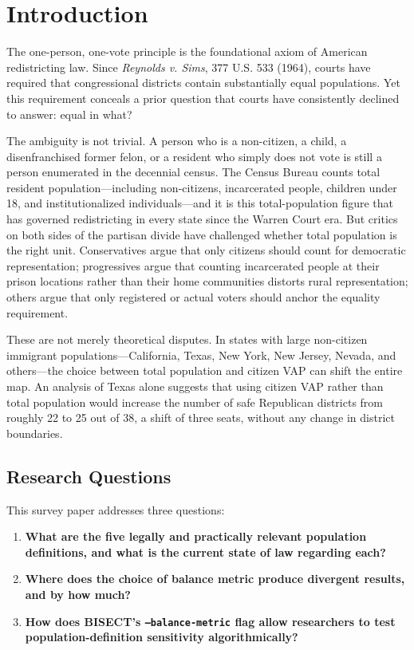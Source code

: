 \section{Introduction}

The one-person, one-vote principle is the foundational axiom of American redistricting law. Since \emph{Reynolds v. Sims}, 377 U.S. 533 (1964), courts have required that congressional districts contain substantially equal populations. Yet this requirement conceals a prior question that courts have consistently declined to answer: equal in what?

The ambiguity is not trivial. A person who is a non-citizen, a child, a disenfranchised former felon, or a resident who simply does not vote is still a person enumerated in the decennial census. The Census Bureau counts total resident population---including non-citizens, incarcerated people, children under 18, and institutionalized individuals---and it is this total-population figure that has governed redistricting in every state since the Warren Court era. But critics on both sides of the partisan divide have challenged whether total population is the right unit. Conservatives argue that only citizens should count for democratic representation; progressives argue that counting incarcerated people at their prison locations rather than their home communities distorts rural representation; others argue that only registered or actual voters should anchor the equality requirement.

These are not merely theoretical disputes. In states with large non-citizen immigrant populations---California, Texas, New York, New Jersey, Nevada, and others---the choice between total population and citizen VAP can shift the entire map. An analysis of Texas alone suggests that using citizen VAP rather than total population would increase the number of safe Republican districts from roughly 22 to 25 out of 38, a shift of three seats, without any change in district boundaries.

\subsection{Research Questions}

This survey paper addresses three questions:

\begin{enumerate}
    \item \textbf{What are the five legally and practically relevant population definitions, and what is the current state of law regarding each?}
    \item \textbf{Where does the choice of balance metric produce divergent results, and by how much?}
    \item \textbf{How does BISECT's \texttt{--balance-metric} flag allow researchers to test population-definition sensitivity algorithmically?}
\end{enumerate}

